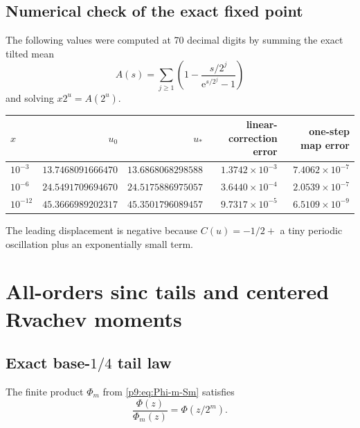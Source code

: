 \documentclass[11pt]{article}
\numberwithin{equation}{section}
\theoremstyle{definition}
\theoremstyle{remark}
\newcommand{\e}{\mathrm e}
\begin{document}
\subsection{Numerical check of the exact fixed point}
The following values were computed at 70 decimal digits by summing the exact tilted mean
\[
 A(s)=\sum_{j\ge1}\left(1-\frac{s/2^j}{\e^{s/2^j}-1}\right)
\]
and solving $x2^u=A(2^u)$.
\begin{center}
\small
\begin{tabular}{@{}lrrrr@{}}
\toprule
$x$ & $u_0$ & $u_*$ & linear-correction error & one-step map error\\
\midrule
$10^{-3}$
& $13.7468091666470$ & $13.6868068298588$
& $1.3742\times10^{-3}$ & $7.4062\times10^{-7}$\\
$10^{-6}$
& $24.5491709694670$ & $24.5175886975057$
& $3.6440\times10^{-4}$ & $2.0539\times10^{-7}$\\
$10^{-12}$
& $45.3666989202317$ & $45.3501796089457$
& $9.7317\times10^{-5}$ & $6.5109\times10^{-9}$\\
\bottomrule
\end{tabular}
\end{center}
The leading displacement is negative because $C(u)=-1/2+$ a tiny periodic oscillation plus
an exponentially small term.

\section{All-orders sinc tails and centered Rvachev moments}
\label{p9:sec:tail-moments}

\subsection{Exact base-$1/4$ tail law}
The finite product $\Phi_m$ from \eqref{p9:eq:Phi-m-Sm} satisfies
\begin{equation}
 \frac{\Phi(z)}{\Phi_m(z)}=\Phi(z/2^m).                    \label{p9:eq:tail-shell}
\end{equation}
\end{document}
